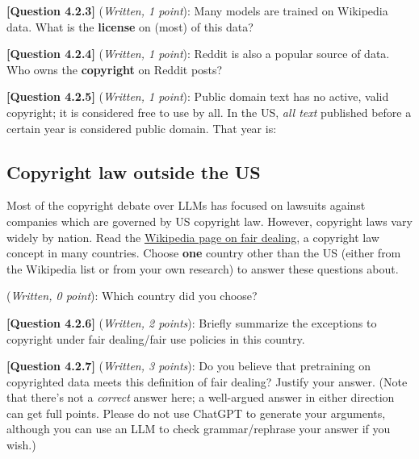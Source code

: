\documentclass[leqno,12pt]{article}
\begin{document}
\noindent \textbf{[Question 4.2.3]} (\emph{Written, 1 point}): Many models are trained on Wikipedia data. What is the \textbf{license} on (most) of this data? 
\begin{tcolorbox}[fit,height=1cm, blank, borderline={1pt}{-2pt}]\end{tcolorbox}


\noindent \textbf{[Question 4.2.4]} (\emph{Written, 1 point}): Reddit is also a popular source of data. Who owns the \textbf{copyright} on Reddit posts? 
\begin{tcolorbox}[fit,height=1cm, blank, borderline={1pt}{-2pt}]\end{tcolorbox}

\noindent \textbf{[Question 4.2.5]} (\emph{Written, 1 point}): Public domain text has no active, valid copyright; it is considered free to use by all. In the US, \textit{all text} published before a certain year is considered public domain. That year is: 
\begin{tcolorbox}[fit,height=1cm, blank, borderline={1pt}{-2pt}]\end{tcolorbox}



\subsection{Copyright law outside the US} 
Most of the copyright debate over LLMs has focused on lawsuits against companies which are governed by US copyright law. However, copyright laws vary widely by nation. Read the \href{https://en.wikipedia.org/wiki/Fair_dealing}{Wikipedia page on fair dealing}, a copyright law concept in many countries. Choose \textbf{one} country other than the US (either from the Wikipedia list or from your own research) to answer these questions about.

\noindent (\emph{Written, 0 point}): Which country did you choose?
\begin{tcolorbox}[fit,height=1cm, blank, borderline={1pt}{-2pt}]\end{tcolorbox}


\noindent \textbf{[Question 4.2.6]} (\emph{Written, 2 points}): Briefly summarize the exceptions to copyright under fair dealing/fair use policies in this country.
\begin{tcolorbox}[fit,height=5cm, blank, borderline={1pt}{-2pt}]\end{tcolorbox}

\noindent \textbf{[Question 4.2.7]} (\emph{Written, 3 points}): Do you believe that pretraining on copyrighted data meets this definition of fair dealing? Justify your answer. (Note that there's not a \textit{correct} answer here; a well-argued answer in either direction can get full points. Please do not use ChatGPT to generate your arguments, although you can use an LLM to check grammar/rephrase your answer if you wish.) 
\begin{tcolorbox}[fit,height=8cm, blank, borderline={1pt}{-2pt}]\end{tcolorbox}
\end{document}
